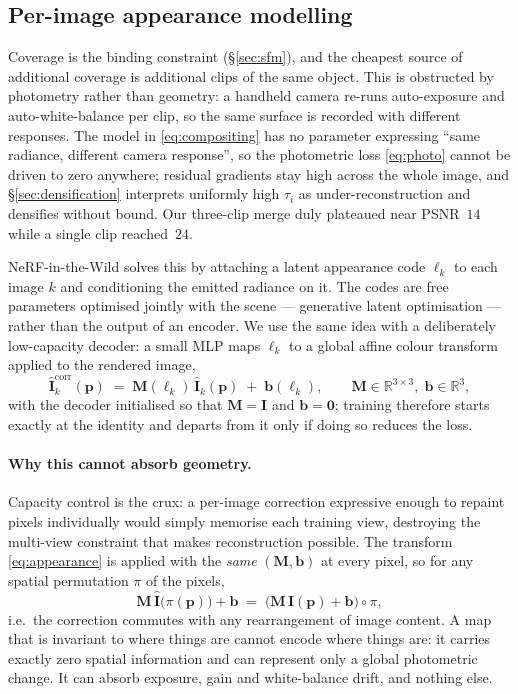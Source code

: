 \subsection{Per-image appearance modelling}
\label{sec:appearance}

Coverage is the binding constraint (\S\ref{sec:sfm}), and the cheapest source of
additional coverage is additional clips of the same object. This is obstructed by
photometry rather than geometry: a handheld camera re-runs auto-exposure and
auto-white-balance per clip, so the same surface is recorded with different
responses. The model in \eqref{eq:compositing} has no parameter expressing ``same
radiance, different camera response'', so the photometric loss
\eqref{eq:photo} cannot be driven to zero anywhere; residual gradients stay high
across the whole image, and \S\ref{sec:densification} interprets uniformly high
$\tau_i$ as under-reconstruction and densifies without bound. Our three-clip merge
duly plateaued near PSNR~$14$ while a single clip reached~$24$.

NeRF-in-the-Wild \cite{martinbrualla2021nerfw} solves this by attaching a latent
appearance code $\bm{\ell}_k$ to each image $k$ and conditioning the emitted
radiance on it. The codes are free parameters optimised jointly with the scene ---
generative latent optimisation \cite{bojanowski2018glo} --- rather than the output
of an encoder. We use the same idea with a deliberately low-capacity decoder: a
small MLP maps $\bm{\ell}_k$ to a global affine colour transform applied to the
rendered image,
\begin{equation}
  \hat{\bm{I}}_k^{\text{corr}}(\bm{p}) \;=\; \bm{M}(\bm{\ell}_k)\,\hat{\bm{I}}_k(\bm{p}) \;+\; \bm{b}(\bm{\ell}_k),
  \qquad
  \bm{M}\in\mathbb{R}^{3\times3},\;\bm{b}\in\mathbb{R}^{3},
  \label{eq:appearance}
\end{equation}
with the decoder initialised so that $\bm{M}=\bm{I}$ and $\bm{b}=\bm{0}$;
training therefore starts exactly at the identity and departs from it only if
doing so reduces the loss.

\paragraph{Why this cannot absorb geometry.}
Capacity control is the crux: a per-image correction expressive enough to repaint
pixels individually would simply memorise each training view, destroying the
multi-view constraint that makes reconstruction possible. The transform
\eqref{eq:appearance} is applied with the \emph{same} $(\bm{M},\bm{b})$ at every
pixel, so for any spatial permutation $\pi$ of the pixels,
\begin{equation}
  \bm{M}\,\hat{\bm{I}}\big(\pi(\bm{p})\big)+\bm{b}
  \;=\;
  \Big(\bm{M}\,\hat{\bm{I}}(\bm{p})+\bm{b}\Big)\circ\pi ,
\end{equation}
i.e.\ the correction commutes with any rearrangement of image content. A map that
is invariant to where things are cannot encode where things are: it carries
exactly zero spatial information and can represent only a global photometric
change. It can absorb exposure, gain and white-balance drift, and nothing else.


